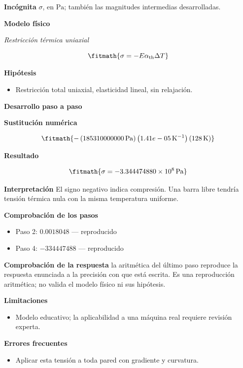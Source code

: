 \documentclass[10pt,openany]{book}
\begin{document}
\noindent\textbf{Incógnita}
$\sigma$, en $\mathrm{Pa}$; también las magnitudes intermedias desarrolladas.

\noindent\textbf{Modelo físico}

\noindent\textit{Restricción térmica uniaxial}

\[
\fitmath{\sigma=- E \alpha_{\mathrm{th}} \Delta T}
\]

\noindent\textbf{Hipótesis}
\begin{itemize}
\item Restricción total uniaxial, elasticidad lineal, sin relajación.
\end{itemize}

\noindent\textbf{Desarrollo paso a paso}



\noindent\textbf{Sustitución numérica}

\[
\fitmath{- \left(185310000000\,\mathrm{Pa}\right) \left(1.41e-05\,\mathrm{K}^{-1}\right) \left(128\,\mathrm{K}\right)}
\]

\noindent\textbf{Resultado}

\[
\fitmath{\sigma=-3.344474880\times10^{8}\,\mathrm{Pa}}
\]

\noindent\textbf{Interpretación}
El signo negativo indica compresión. Una barra libre tendría tensión térmica nula con la misma temperatura uniforme.

\noindent\textbf{Comprobación de los pasos}
\begin{itemize}
\item Paso 2: $0.0018048$ — reproducido
\item Paso 4: $-334447488$ — reproducido
\end{itemize}

\noindent\textbf{Comprobación de la respuesta} la aritmética del último paso reproduce la respuesta enunciada a la precisión con que está escrita. Es una reproducción aritmética; no valida el modelo físico ni sus hipótesis.

\noindent\textbf{Limitaciones}
\begin{itemize}
\item Modelo educativo; la aplicabilidad a una máquina real requiere revisión experta.
\end{itemize}

\noindent\textbf{Errores frecuentes}
\begin{itemize}
\item Aplicar esta tensión a toda pared con gradiente y curvatura.
\end{itemize}
\end{document}

